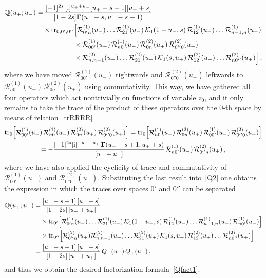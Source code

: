 \documentclass[a4paper,11pt]{article}
\renewcommand{\imath}{\mathrm{i}}
\newcommand{\tr}{\mathop{\rm tr}\nolimits}
\numberwithin{equation}{section}
\begin{document}
\begin{align}
	\nonumber
	\mathbb{Q}(u_+;u_-) = & \,
	\frac{[-1]^{2s}\,[\imath]^{u_+ + u_-} [u_+-s+1] [u_-+s]}{[1-2s] \mathbf{\Gamma}(u_++s, u_--s+1)} \\
	& \label{Q2}
	\begin{aligned}
		\, \times \tr_{0,0',0''} &\Bigl[\mathcal{R}^{(1)}_{0'n}(u_-)\ldots\mathcal{R}^{(1)}_{21}(u_-)\,\mathcal{K}_1(1-u_-,s)\,\mathcal{R}^{(1)}_{12}(u_-)\ldots\mathcal{R}^{(1)}_{n-1,n}(u_-) \\
		&
		\times
		\mathcal{R}^{(1)}_{00'}(u_-)\,\mathcal{R}^{(1)}_{n0}(u_-)\,\mathcal{R}^{(2)}_{0n}(u_+)\,\mathcal{R}^{(2)}_{0''0}(u_+) \\
		& 
		\times\mathcal{R}^{(2)}_{n,n-1}(u_+)\ldots\mathcal{R}^{(2)}_{21}(u_+)\,\mathcal{K}_1(s,u_+)\,\mathcal{R}^{(2)}_{12}(u_+)\ldots\mathcal{R}^{(2)}_{n0''}(u_+)\Bigr] \,,
	\end{aligned}
\end{align}
where we have moved $\mathcal{R}^{(1)}_{00'}(u_-)$ rightwards and $\mathcal{R}^{(2)}_{0''0}(u_+)$ leftwards to $\mathcal{R}^{(1)}_{n0}(u_-)\,\mathcal{R}^{(2)}_{0n}(u_+)$ using commutativity.
This way, we have gathered all four operators which act nontrivially on functions of variable $z_0$, and it only remains to take the trace of the product of these operators over the $0$-th space by means of relation~\eqref{trRRRR}
\begin{multline*}
	\tr_0\Bigl[\mathcal{R}^{(1)}_{00'}(u_-)\,\mathcal{R}^{(1)}_{n0}(u_-)\,\mathcal{R}^{(2)}_{0n}(u_+)\,\mathcal{R}^{(2)}_{0''0}(u_+)\Bigr] =
	\tr_0\Bigl[\mathcal{R}^{(1)}_{n0}(u_-)\,\mathcal{R}^{(2)}_{0n}(u_+)\,\mathcal{R}^{(1)}_{00'}(u_-)\,\mathcal{R}^{(2)}_{0''0}(u_+)\Bigr] \\
	=
	-\frac{[-1]^{2s} [\imath]^{-u_--u_+}\,\mathbf{\Gamma}(u_--s+1, u_++s)}{[u_-+u_+]}
	\,\mathcal{R}^{(1)}_{n0'}(u_-)\,\mathcal{R}^{(2)}_{0''n}(u_+) \,,
\end{multline*}
where we have also applied the cyclicity of trace and commutativity of $\mathcal{R}^{(1)}_{00'}(u_-)$ and $\mathcal{R}^{(2)}_{0''0}(u_+)$.
Substituting the last result into~\eqref{Q2} one obtains the expression in which the traces over spaces $0'$ and $0''$ can be separated
\begin{align}
	\nonumber
	\mathbb{Q}(u_+;u_-)
	= & \,
	\frac{[u_+-s+1] \, [u_-+s]}{[1-2s] \, [u_-+u_+]} \\
	& \nonumber
	\begin{aligned}
		& \times \tr_{0'} \Bigl[\mathcal{R}^{(1)}_{0'n}(u_-)\ldots\mathcal{R}^{(1)}_{21}(u_-)\,\mathcal{K}_1(1-u_-,s)\,\mathcal{R}^{(1)}_{12}(u_-)\ldots\mathcal{R}^{(1)}_{n-1,n}(u_-)\,\mathcal{R}^{(1)}_{n0'}(u_-)\Bigr] \\
		& \times
		\tr_{0''}
		\Bigl[\mathcal{R}^{(2)}_{0''n}(u_+)\mathcal{R}^{(2)}_{n,n-1}(u_+)\ldots\mathcal{R}^{(2)}_{21}(u_+)\,\mathcal{K}_1(s,u_+)\,\mathcal{R}^{(2)}_{12}(u_+)\ldots\mathcal{R}^{(2)}_{n0''}(u_+)\Bigr]
	\end{aligned}
	\\
	= & \,
	\frac{[u_+-s+1] \, [u_-+s]}{[1-2s] \, [u_-+u_+]} \, Q_-(u_-) \, Q_+(u_+) \,,
\end{align}
and thus we obtain the desired factorization formula~\eqref{Qfact1}.
\end{document}
